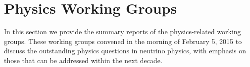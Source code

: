 \section{Physics Working Groups}
\label{sec:Physics WG}

In this section we provide the summary reports of the physics-related
working groups.  These working groups convened in the morning of
February 5, 2015 to discuss the outstanding physics questions in neutrino
physics, with emphasis on those that can be addressed within the next
decade.
